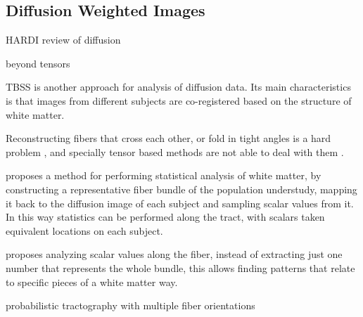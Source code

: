 
\subsection{Diffusion Weighted Images}


HARDI
\autocite{jellison_diffusion_2004} review of diffusion 	


\autocite{tournier_diffusion_2011} beyond tensors



TBSS \autocite{smith_tract-based_2006} is another approach for analysis of diffusion data. Its main characteristics is that images from different subjects are co-registered based on the structure of white matter. 

Reconstructing fibers that cross each other, or fold in tight angles is a hard problem \autocite{fillard_quantitative_2011}, and specially tensor based methods are not able to deal with them \autocite{tournier_diffusion_2011}.

\autocite{goodlett_group_2008} proposes a method for performing statistical analysis of white matter, by constructing a representative fiber bundle of the population understudy, mapping it back to the diffusion image of each subject and sampling scalar values from it. In this way statistics can be performed along the tract, with scalars taken equivalent locations on each subject.

\autocite{colby_along-tract_2011} proposes analyzing scalar values along the fiber, instead of extracting just one number that represents the whole bundle, this allows finding patterns that relate to specific pieces of a white matter way.

\autocite{behrens_probabilistic_2007} probabilistic tractography with multiple fiber orientations


